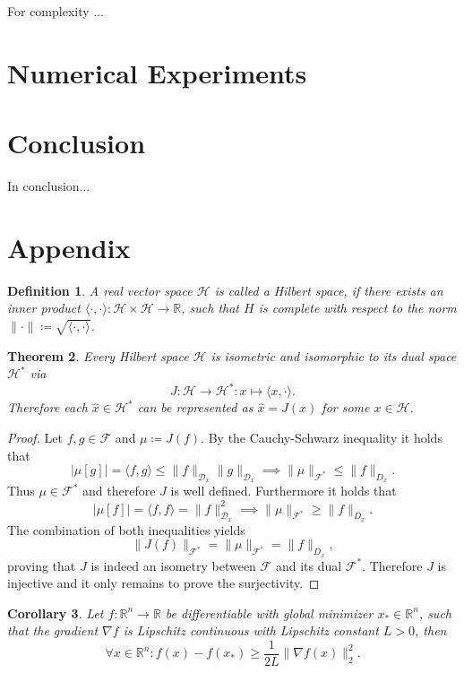 \documentclass[11pt, a4paper]{article}
\newtheorem{theorem}{Theorem}[section]
\newtheorem{corollary}[theorem]{Corollary}
\newtheorem{definition}[theorem]{Definition}
\newcommand{\R}{\mathds{R}}
\newcommand{\D}{\mathcal{D}}
\newcommand{\F}{\mathcal{F}}
\renewcommand{\H}{\mathcal{H}}
\begin{document}
For complexity ...

\pagebreak
\section{Numerical Experiments}

\pagebreak
\section{Conclusion}

In conclusion...

\pagebreak
\section{Appendix}

\begin{definition}
A real vector space $\H$ is called a Hilbert space, if there exists an inner product $\langle \cdot,\cdot \rangle : \H \times \H \to \R$, such that $H$ is complete with respect to the norm $\| \cdot \| \coloneq \sqrt{\langle \cdot,\cdot \rangle}$.
\end{definition}

\begin{theorem}
Every Hilbert space $\H$ is isometric and isomorphic to its dual space $\H^*$ via
\[ J: \H \to \H^* : x \mapsto \langle x, \cdot \rangle. \]
Therefore each $\hat{x} \in \H^*$ can be represented as $\hat{x} = J(x)$ for some $x \in \H$.
\end{theorem}

\begin{proof}
Let $f, g \in \F$ and $\mu \coloneq J(f)$. By the Cauchy-Schwarz inequality it holds that
\[ \big | \mu[g] \big | = \langle f,g \rangle \leq \big \| f \big \|_{\D_x} \big \| g \big \|_{\D_x} \implies \big \| \mu \big \|_{\F^*} \le \big \| f \big \|_{D_x}. \]
Thus $\mu \in \F^*$ and therefore $J$ is well defined. Furthermore it holds that 
\[ \big | \mu[f] \big | = \langle f,f \rangle = \big \| f \big \|_{\D_x}^2 \implies \big \| \mu \big \|_{\F^*} \ge \big \| f \big \|_{D_x}. \]
The combination of both inequalities yields
\[ \big \| J(f) \big \|_{\F^*} = \big \| \mu \big \|_{\F^*} = \big \| f \big \|_{D_x}, \]
proving that $J$ is indeed an isometry between $\F$ and its dual $\F^*$. Therefore $J$ is injective and it only remains to prove the surjectivity.
\end{proof}

\begin{corollary} \label{cor:descent}
Let $f: \R^n \to \R$ be differentiable with global minimizer $x_* \in \R^n$, such that the gradient $\nabla f$ is Lipschitz continuous with Lipschitz constant $L >0$, then
\[ \forall x \in \R^n : f(x) - f(x_*) \geq \frac{1}{2L} \big \| \nabla f(x) \big \|_2^2. \]
\end{corollary}
\end{document}

